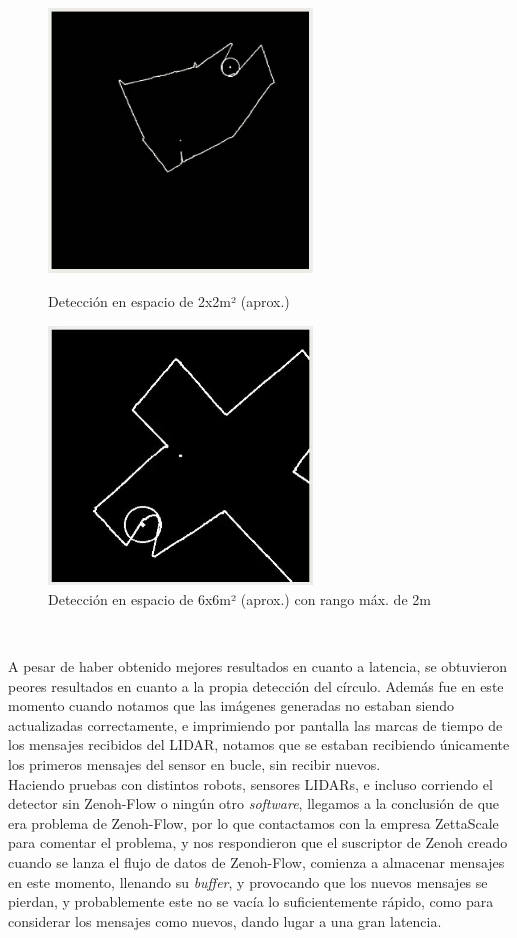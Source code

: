 \begin{figure}[h!]
  \centering
  \begin{minipage}{0.45\textwidth}
    \centering
    \includegraphics[width=7cm]{figs/lab_2x2}
    \caption{Detección en espacio de 2x2m² (aprox.)}
    \label{fig:lab_2x2}
  \end{minipage}
  \hfill
  \begin{minipage}{0.45\textwidth}
    \centering
    \includegraphics[width=7cm]{figs/lab_6x6_max2m}
    \caption{Detección en espacio de 6x6m² (aprox.) con rango máx. de 2m}
    \label{fig:lab_6x6}
  \end{minipage}
\end{figure}\

A pesar de haber obtenido mejores resultados en cuanto a latencia, se obtuvieron
peores resultados en cuanto a la propia detección del círculo.
Además fue en este momento cuando notamos que las imágenes generadas no estaban
siendo actualizadas correctamente, e imprimiendo por pantalla las marcas de
tiempo de los mensajes recibidos del LIDAR, notamos que se estaban recibiendo
únicamente los primeros mensajes del sensor en bucle, sin recibir nuevos.
\\

Haciendo pruebas con distintos robots, sensores LIDARs, e incluso corriendo el
detector sin Zenoh-Flow o ningún otro \textit{software}, llegamos a la
conclusión de que era problema de Zenoh-Flow, por lo que contactamos con la
empresa ZettaScale para comentar el problema, y nos respondieron que el
suscriptor de Zenoh creado cuando se lanza el flujo de datos de Zenoh-Flow,
comienza a almacenar mensajes en este momento, llenando su \textit{buffer}, y
provocando que los nuevos mensajes se pierdan, y probablemente este no se vacía
lo suficientemente rápido, como para considerar los mensajes como nuevos, dando
lugar a una gran latencia.
\\



